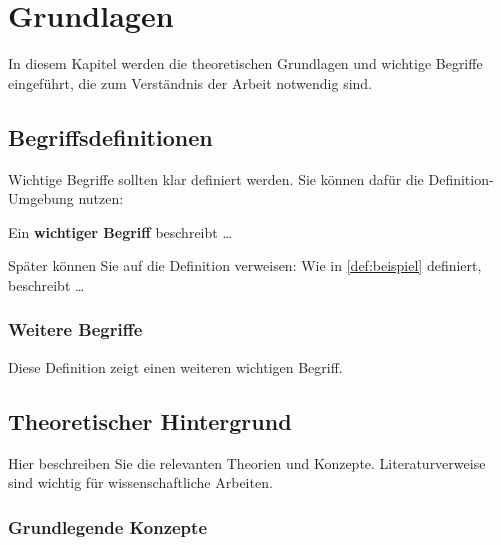 
\chapter{Grundlagen}
\label{chap:grundlagen}


In diesem Kapitel werden die theoretischen Grundlagen und wichtige Begriffe eingeführt, die zum Verständnis der Arbeit notwendig sind.

\section{Begriffsdefinitionen}
\label{sec:begriffe}

Wichtige Begriffe sollten klar definiert werden. Sie können dafür die Definition-Umgebung nutzen:

\begin{definition}
    \label{def:beispiel}
    Ein \textbf{wichtiger Begriff} beschreibt \dots
\end{definition}

Später können Sie auf die Definition verweisen: Wie in \autoref{def:beispiel} definiert, beschreibt \dots

\subsection{Weitere Begriffe}

\begin{definition}
    \label{def:zweiter-begriff}
    Diese Definition zeigt einen weiteren wichtigen Begriff.
\end{definition}

\section{Theoretischer Hintergrund}
\label{sec:theorie}

Hier beschreiben Sie die relevanten Theorien und Konzepte. Literaturverweise sind wichtig für wissenschaftliche Arbeiten.

\subsection{Grundlegende Konzepte}

